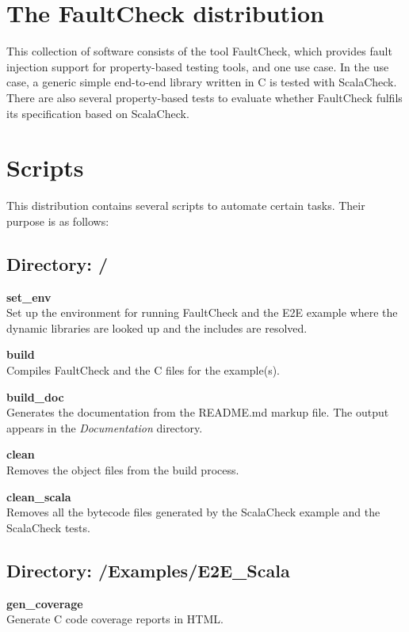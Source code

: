 \section{The FaultCheck distribution}\label{the-faultcheck-distribution}

This collection of software consists of the tool FaultCheck, which
provides fault injection support for property-based testing tools, and
one use case. In the use case, a generic simple end-to-end library
written in C is tested with ScalaCheck. There are also several
property-based tests to evaluate whether FaultCheck fulfils its
specification based on ScalaCheck.

\section{Scripts}\label{scripts}

This distribution contains several scripts to automate certain tasks.
Their purpose is as follows:

\subsection{Directory: /}\label{directory}

\textbf{set\_env}\\Set up the environment for running FaultCheck and the
E2E example where the dynamic libraries are looked up and the includes
are resolved.

\textbf{build}\\Compiles FaultCheck and the C files for the example(s).

\textbf{build\_doc}\\Generates the documentation from the README.md
markup file. The output appears in the \emph{Documentation} directory.

\textbf{clean}\\Removes the object files from the build process.

\textbf{clean\_scala}\\Removes all the bytecode files generated by the
ScalaCheck example and the ScalaCheck tests.

\subsection{Directory:
/Examples/E2E\_Scala}\label{directory-examplese2eux5fscala}

\textbf{gen\_coverage}\\Generate C code coverage reports in HTML.

